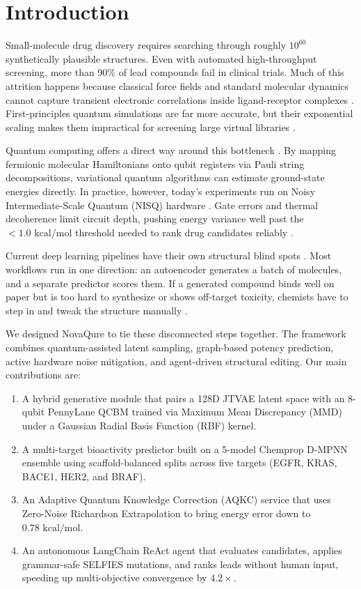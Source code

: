 \documentclass[journal,10pt,twocolumn]{IEEEtran}
\begin{document}
\section{Introduction}
Small-molecule drug discovery requires searching through roughly $10^{60}$ synthetically plausible structures. Even with automated high-throughput screening, more than 90\% of lead compounds fail in clinical trials. Much of this attrition happens because classical force fields and standard molecular dynamics cannot capture transient electronic correlations inside ligand-receptor complexes \cite{vamathevan2019applications, zhou2026quantum}. First-principles quantum simulations are far more accurate, but their exponential scaling makes them impractical for screening large virtual libraries \cite{li2024hybrid}.

Quantum computing offers a direct way around this bottleneck \cite{du2020quantum, li2021drug}. By mapping fermionic molecular Hamiltonians onto qubit registers via Pauli string decompositions, variational quantum algorithms can estimate ground-state energies directly. In practice, however, today's experiments run on Noisy Intermediate-Scale Quantum (NISQ) hardware \cite{cao2022recent, mensa2022quantum}. Gate errors and thermal decoherence limit circuit depth, pushing energy variance well past the $<1.0\text{ kcal/mol}$ threshold needed to rank drug candidates reliably \cite{yin2025benchmarking}.

Current deep learning pipelines have their own structural blind spots \cite{gomez2018automatic, jin2018junction}. Most workflows run in one direction: an autoencoder generates a batch of molecules, and a separate predictor scores them. If a generated compound binds well on paper but is too hard to synthesize or shows off-target toxicity, chemists have to step in and tweak the structure manually \cite{yang2019analyzing, brown2019guacamol}.

We designed NovaQure to tie these disconnected steps together. The framework combines quantum-assisted latent sampling, graph-based potency prediction, active hardware noise mitigation, and agent-driven structural editing. Our main contributions are:
\begin{enumerate}
    \item A hybrid generative module that pairs a 128D JTVAE latent space with an 8-qubit PennyLane QCBM trained via Maximum Mean Discrepancy (MMD) under a Gaussian Radial Basis Function (RBF) kernel.
    \item A multi-target bioactivity predictor built on a 5-model Chemprop D-MPNN ensemble using scaffold-balanced splits across five targets (EGFR, KRAS, BACE1, HER2, and BRAF).
    \item An Adaptive Quantum Knowledge Correction (AQKC) service that uses Zero-Noise Richardson Extrapolation to bring energy error down to $0.78\text{ kcal/mol}$.
    \item An autonomous LangChain ReAct agent that evaluates candidates, applies grammar-safe SELFIES mutations, and ranks leads without human input, speeding up multi-objective convergence by $4.2\times$.
\end{enumerate}
\end{document}
